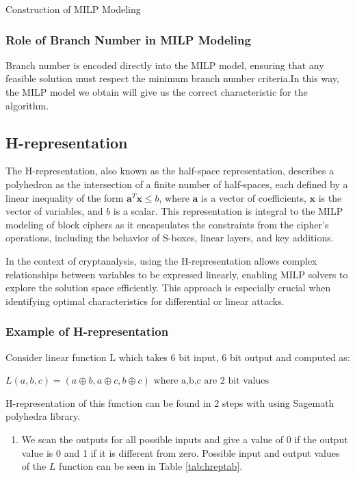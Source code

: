 \documentclass [version=final]{iacrcc}
\begin{document}
\begin{section}{Construction of MILP Modeling}
\subsubsection{Role of Branch Number in MILP Modeling}
Branch number is encoded directly into the MILP model, ensuring that any feasible solution must respect the minimum branch number criteria.In this way, the MILP model we obtain will give us the correct characteristic for the algorithm.

\subsection{H-representation}

The H-representation, also known as the half-space representation, describes a polyhedron as the intersection of a finite number of half-spaces, each defined by a linear inequality of the form $ \mathbf{a}^T \mathbf{x} \leq b $, where $\mathbf{a} $ is a vector of coefficients, $ \mathbf{x} $ is the vector of variables, and $ b $ is a scalar. This representation is integral to the MILP modeling of block ciphers as it encapsulates the constraints from the cipher's operations, including the behavior of S-boxes, linear layers, and key additions.

In the context of cryptanalysis, using the H-representation allows complex relationships between variables to be expressed linearly, enabling MILP solvers to explore the solution space efficiently. This approach is especially crucial when identifying optimal characteristics for differential or linear attacks.

\subsubsection{Example of H-representation}

Consider linear function L which takes 6 bit input, 6 bit output and computed as:
\begin{center}
    $L(a,b,c)=(a \oplus b , a \oplus c , b \oplus c ) \text{ where a,b,c are 2 bit values}  $
\end{center}


H-representation of this function can be found in 2 steps with using  Sagemath polyhedra library. \cite{sage}

\begin{enumerate}
    \item We scan the outputs for all possible inputs and give a value of 0 if the output value is 0 and 1 if it is different from zero. Possible input and output values of the $L$ function can be seen in Table \ref{tab:hreptab}.


\end{enumerate}
\end{section}
\end{document}
